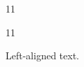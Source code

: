 \documentclass[paper=A4]{ropas-poster}
\begin{document}
\begin{postergrid}{1}{1}
\begin{posterblock}{1}{1}
\begin{flushleft}Left-aligned text.\end{flushleft}
\end{posterblock}
\end{postergrid}
\end{document}
